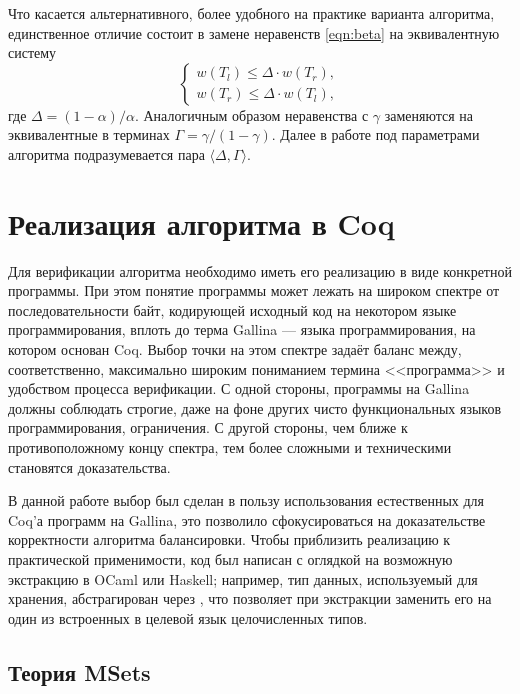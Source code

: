 \documentclass[a4paper,14pt]{extarticle}
\begin{document}
Что касается альтернативного,
более удобного на практике варианта алгоритма,
единственное отличие состоит в замене
неравенств \ref{eqn:beta} на эквивалентную
систему
\begin{equation}
  \begin{cases}
    w(T_l) \leqslant \Delta \cdot w(T_r), \\
    w(T_r) \leqslant \Delta \cdot w(T_l),
  \end{cases}
\end{equation}
где \( \Delta = (1 - \alpha)/\alpha \).
Аналогичным образом неравенства с \( \gamma \)
заменяются на эквивалентные в терминах
\( \Gamma = \gamma/(1 - \gamma) \).
Далее в работе под параметрами алгоритма
подразумевается пара \( \langle \Delta, \Gamma \rangle \).

\clearpage
\section{Реализация алгоритма в Coq}

Для верификации алгоритма необходимо
иметь его реализацию в виде конкретной программы. 
При этом понятие программы
может лежать на широком спектре
от последовательности байт,
кодирующей исходный код
на некотором языке программирования,
вплоть до терма Gallina ---
языка программирования,
на котором основан Coq.
Выбор точки на этом спектре
задаёт баланс между, соответственно,
максимально широким пониманием термина <<программа>>
и удобством процесса верификации.
С одной стороны, программы на Gallina
должны соблюдать строгие,
даже на фоне других
чисто функциональных языков программирования,
ограничения.
С другой стороны,
чем ближе к противоположному концу спектра,
тем более сложными и техническими
становятся доказательства.

В данной работе
выбор был сделан в пользу
использования естественных
для Coq'а программ на Gallina,
это позволило сфокусироваться на доказательстве
корректности алгоритма балансировки.
Чтобы приблизить реализацию к практической применимости,
код был написан с оглядкой на
возможную экстракцию в OCaml или Haskell;
например, тип данных, используемый для хранения,
абстрагирован через ,
что позволяет при экстракции заменить его
на один из встроенных в целевой язык целочисленных типов.

\subsection{Теория MSets}
\end{document}
